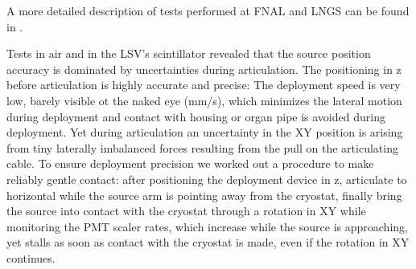 A more detailed description of tests performed at FNAL and LNGS can be found in \cite{thesis:Hackett, thesis:Edkins}.

Tests in air and in the LSV's scintillator revealed that the source position accuracy is dominated by uncertainties during articulation. The positioning in z before articulation is highly accurate and precise: The deployment speed is very low, barely visible ot the naked eye (mm/s), which minimizes the lateral motion during deployment and contact with housing or organ pipe is avoided during deployment. Yet during articulation an uncertainty in the XY position is arising from tiny laterally imbalanced forces resulting from the pull on the articulating cable. To ensure deployment precision we worked out a procedure to make reliably gentle contact: 
after positioning the deployment device in z, articulate to horizontal while the source arm is pointing away from the cryostat, finally bring the source into contact with the cryostat through a rotation in XY while monitoring the PMT scaler rates, which increase while the source is approaching, yet stalls as soon as contact with the cryostat is made, even if the rotation in XY continues.



